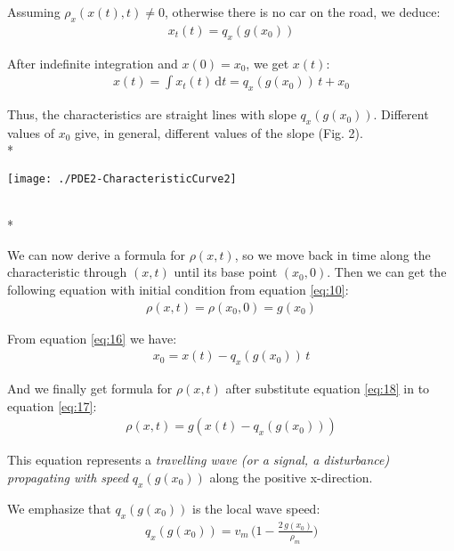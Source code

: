 \documentclass[../main.tex]{subfiles}
\begin{document}
Assuming $\rho_x(x(t),t) \ne 0$, otherwise there is no car on the road, we deduce:
\begin{align}
    x_t(t) = q_x(g(x_0)) \label{eq:15} 
\end{align}

After indefinite integration and $x(0) = x_0$, we get $x(t)$:
\begin{align}
    x(t) = \int x_t(t) \, \mathrm{d}t = q_x(g(x_0)) \, t + x_0 \label{eq:16}
\end{align}

Thus, the characteristics are straight lines with slope $q_x(g (x_0))$. Different values of $x_0$ give, in general, different values of the slope (Fig. 2).
\\*

\begin{wrapfigure}{\linewidth} \label{fig:2}
\centering
\texttt{[image: ./PDE2-CharacteristicCurve2]}
    \begin{center}
    \end{center}
\end{wrapfigure}
\\*

We can now derive a formula for $\rho(x,t)$, so we move back in time along the characteristic through $(x,t)$ until its base point $(x_0,0)$. Then we can get the following equation with initial condition from equation \ref{eq:10}:
\begin{align}
    \rho(x,t) = \rho(x_0,0) = g(x_0) \label{eq:17}
\end{align}

From equation \ref{eq:16} we have:
\begin{align}
    x_0 = x(t) - q_x(g(x_0)) \, t \label{eq:18}
\end{align}

And we finally get formula for $\rho(x,t)$ after substitute equation \ref{eq:18} in to equation \ref{eq:17}:
\begin{align}
    \rho(x,t) = g(x(t) - q_x(g(x_0))) \label{eq:19}
\end{align}

This equation represents a \textit{travelling wave (or a signal, a disturbance) propagating with speed} $q_x(g (x_0))$ along the positive x-direction.

We emphasize that $q_x(g(x_0))$ is the local wave speed:
\begin{align}
    q_x(g(x_0)) = v_m \, \bigg(1 - \frac{2 \, g(x_0)}{\rho_m} \bigg) \label{eq:20}
\end{align}
\end{document}
